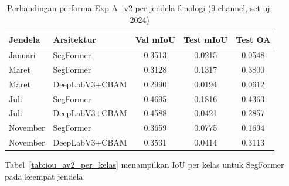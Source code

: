 \begin{table}[H]
    \centering
    \caption{Perbandingan performa Exp A\_v2 per jendela fenologi (9 channel, set uji 2024)}
    \label{tab:av2_results}
    \begin{tabular}{|l|l|c|c|c|}
    \hline
    \textbf{Jendela} & \textbf{Arsitektur} & \textbf{Val mIoU} & \textbf{Test mIoU} & \textbf{Test OA} \\
    \hline
    Januari  & SegFormer      & 0.3513 & 0.0215 & 0.0548 \\
    \hline
    Maret    & SegFormer      & 0.3128 & 0.1317 & 0.3800 \\
    Maret    & DeepLabV3+CBAM & 0.2990 & 0.0194 & 0.0612 \\
    \hline
    Juli     & SegFormer      & 0.4695 & 0.1816 & 0.4363 \\
    Juli     & DeepLabV3+CBAM & 0.4588 & 0.0421 & 0.2857 \\
    \hline
    November & SegFormer      & 0.3659 & 0.0775 & 0.1694 \\
    November & DeepLabV3+CBAM & 0.3531 & 0.0414 & 0.3113 \\
    \hline
    \end{tabular}
\end{table}

Tabel~\ref{tab:iou_av2_per_kelas} menampilkan IoU per kelas untuk SegFormer pada keempat jendela.

\begin{table}[H]
    \centering
    \caption{IoU per kelas Exp A\_v2 SegFormer per jendela fenologi (set uji 2024, \%)}
    \label{tab:iou_av2_per_kelas}
\end{table}

